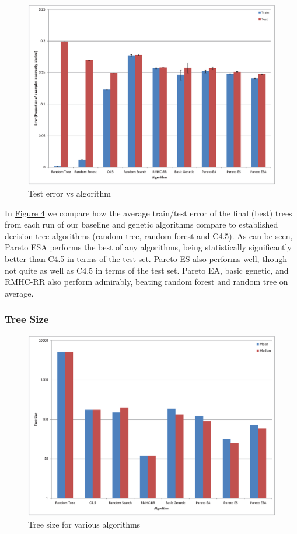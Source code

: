 \documentclass{acm_proc_article-sp}
\begin{document}
\begin{figure}[h]
\centering
\includegraphics[width=\linewidth]{error_comparison_chart.eps}
\caption{Test error vs algorithm}\label{algorithms}
\end{figure}

In \hyperref[algorithms]{Figure 4} we compare how the average train/test error of the final (best) trees from each run of our baseline and genetic algorithms compare to established decision tree algorithms (random tree, random forest and C4.5). As can be seen, Pareto ESA performs the best of any algorithms, being statistically significantly better than C4.5 in terms of the test set. Pareto ES also performs well, though not quite as well as C4.5 in terms of the test set. Pareto EA, basic genetic, and RMHC-RR also perform admirably, beating random forest and random tree on average.

\subsubsection{Tree Size}

\begin{figure}[h]
\centering
\includegraphics[width=\linewidth]{size_chart.eps}
\caption{Tree size for various algorithms}\label{size}
\end{figure}
\end{document}
